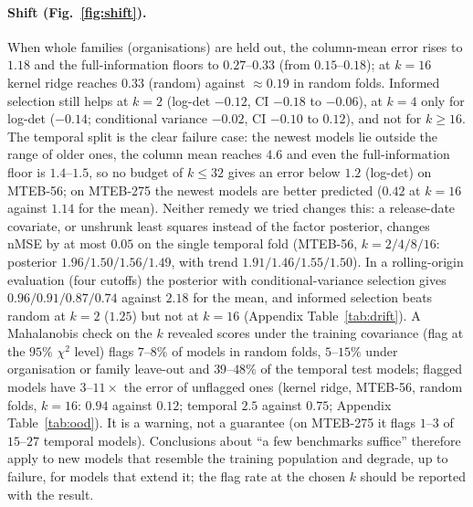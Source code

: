 \paragraph{Shift (Fig.~\ref{fig:shift}).} When whole families (organisations) are held out, the column-mean error rises to $1.18$ and the full-information floors to $0.27$--$0.33$ (from $0.15$--$0.18$); at $k=16$ kernel ridge reaches $0.33$ (random) against $\approx0.19$ in random folds. Informed selection still helps at $k=2$ (log-det $-0.12$, CI $-0.18$ to $-0.06$), at $k=4$ only for log-det ($-0.14$; conditional variance $-0.02$, CI $-0.10$ to $0.12$), and not for $k\ge16$. The temporal split is the clear failure case: the newest models lie outside the range of older ones, the column mean reaches $4.6$ and even the full-information floor is $1.4$--$1.5$, so no budget of $k\le32$ gives an error below $1.2$ (log-det) on MTEB-56; on MTEB-275 the newest models are better predicted ($0.42$ at $k=16$ against $1.14$ for the mean). Neither remedy we tried changes this: a release-date covariate, or unshrunk least squares instead of the factor posterior, changes nMSE by at most $0.05$ on the single temporal fold (MTEB-56, $k=2/4/8/16$: posterior $1.96/1.50/1.56/1.49$, with trend $1.91/1.46/1.55/1.50$). In a rolling-origin evaluation (four cutoffs) the posterior with conditional-variance selection gives $0.96/0.91/0.87/0.74$ against $2.18$ for the mean, and informed selection beats random at $k=2$ ($1.25$) but not at $k=16$ (Appendix Table~\ref{tab:drift}). A Mahalanobis check on the $k$ revealed scores under the training covariance (flag at the $95\%$ $\chi^2$ level) flags $7$--$8\%$ of models in random folds, $5$--$15\%$ under organisation or family leave-out and $39$--$48\%$ of the temporal test models; flagged models have $3$--$11\times$ the error of unflagged ones (kernel ridge, MTEB-56, random folds, $k=16$: $0.94$ against $0.12$; temporal $2.5$ against $0.75$; Appendix Table~\ref{tab:ood}). It is a warning, not a guarantee (on MTEB-275 it flags $1$--$3$ of $15$--$27$ temporal models). Conclusions about ``a few benchmarks suffice'' therefore apply to new models that resemble the training population and degrade, up to failure, for models that extend it; the flag rate at the chosen $k$ should be reported with the result.

